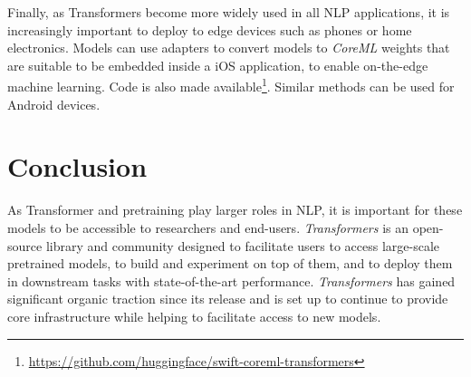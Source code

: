 Finally, as Transformers become more widely used in all NLP applications, it is increasingly important to deploy to edge devices such as phones or home electronics. Models can use adapters to convert models to \textit{CoreML} weights that are suitable to be embedded inside a iOS  application, to enable on-the-edge machine learning. Code is also made available\footnote{\url{https://github.com/huggingface/swift-coreml-transformers}}. Similar methods can be used for Android devices.

\section{Conclusion}

As Transformer and pretraining play larger roles in NLP, it is important for these models to be accessible to researchers and end-users. \textit{Transformers} is an open-source library and community designed to facilitate users to access large-scale pretrained models, to build and experiment on top of them, and to deploy them in downstream tasks with state-of-the-art performance. \textit{Transformers} has gained significant organic traction since its release and is set up to continue to provide core infrastructure while helping to facilitate access to new models.


